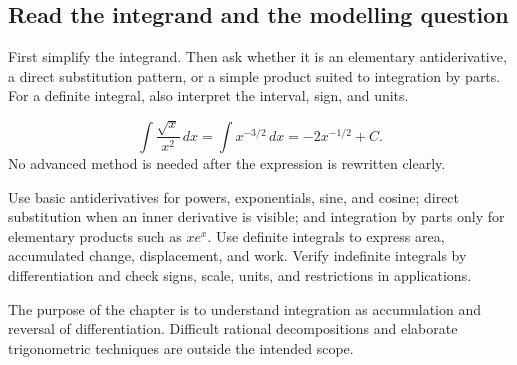 \subsection{Read the integrand and the modelling question}

\begin{corebox}
First simplify the integrand. Then ask whether it is an elementary antiderivative, a direct substitution pattern, or a simple product suited to integration by parts. For a definite integral, also interpret the interval, sign, and units.
\end{corebox}

\begin{examplebox}
\[
\int \frac{\sqrt{x}}{x^2}\,dx
=\int x^{-3/2}\,dx
=-2x^{-1/2}+C.
\]
No advanced method is needed after the expression is rewritten clearly.
\end{examplebox}

\begin{summarybox}
Use basic antiderivatives for powers, exponentials, sine, and cosine; direct substitution when an inner derivative is visible; and integration by parts only for elementary products such as $xe^x$. Use definite integrals to express area, accumulated change, displacement, and work. Verify indefinite integrals by differentiation and check signs, scale, units, and restrictions in applications.
\end{summarybox}

The purpose of the chapter is to understand integration as accumulation and reversal of differentiation. Difficult rational decompositions and elaborate trigonometric techniques are outside the intended scope.
